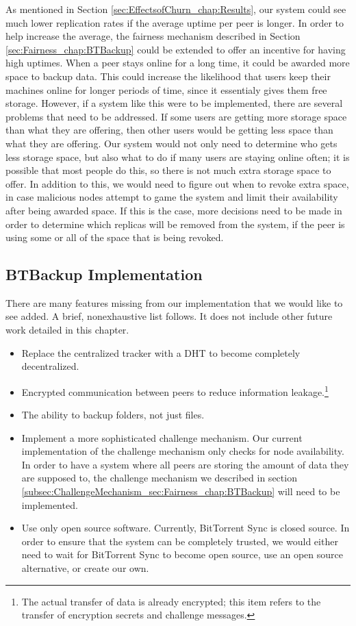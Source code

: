 \documentclass[12pt]{report}
\begin{document}
As mentioned in Section \ref{sec:EffectsofChurn_chap:Results}, our system could see much lower replication rates if the average uptime per peer is longer. In order to help increase the average, the fairness mechanism described in Section \ref{sec:Fairness_chap:BTBackup} could be extended to offer an incentive for having high uptimes. When a peer stays online for a long time, it could be awarded more space to backup data. This could increase the likelihood that users keep their machines online for longer periods of time, since it essentialy gives them free storage. However, if a system like this were to be implemented, there are several problems that need to be addressed. If some users are getting more storage space than what they are offering, then other users would be getting less space than what they are offering. Our system would not only need to determine who gets less storage space, but also what to do if many users are staying online often; it is possible that most people do this, so there is not much extra storage space to offer. In addition to this, we would need to figure out when to revoke extra space, in case malicious nodes attempt to game the system and limit their availability after being awarded space. If this is the case, more decisions need to be made in order to determine which replicas will be removed from the system, if the peer is using some or all of the space that is being revoked.

\subsection{BTBackup Implementation}

There are many features missing from our implementation that we would like to see added. A brief, nonexhaustive list follows. It does not include other future work detailed in this chapter.

\begin{itemize}
    \item Replace the centralized tracker with a DHT to become completely decentralized.
    \item Encrypted communication between peers to reduce information leakage.\footnote{The actual transfer of data is already encrypted; this item refers to the transfer of encryption secrets and challenge messages.}
    \item The ability to backup folders, not just files.
    \item Implement a more sophisticated challenge mechanism. Our current implementation of the challenge mechanism only checks for node availability. In order to have a system where all peers are storing the amount of data they are supposed to, the challenge mechanism we described in section \ref{subsec:ChallengeMechanism_sec:Fairness_chap:BTBackup} will need to be implemented.
    \item Use only open source software. Currently, BitTorrent Sync is closed source. In order to ensure that the system can be completely trusted, we would either need to wait for BitTorrent Sync to become open source, use an open source alternative, or create our own.
\end{itemize}
\end{document}
